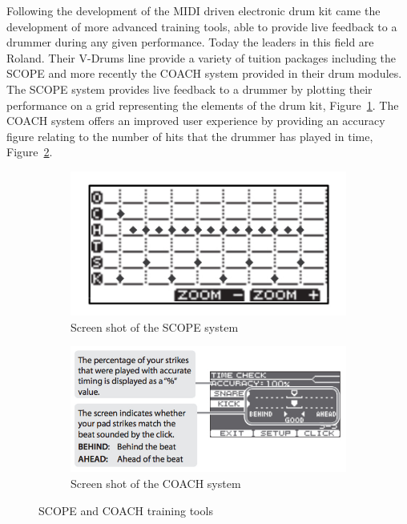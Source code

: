 \documentclass[a4paper, 11pt]{article}
\begin{document}
Following the development of the MIDI driven electronic drum kit came the development of more advanced training tools, able to provide live feedback to a drummer during any given performance. Today the leaders in this field are Roland. Their V-Drums line provide a variety of tuition packages including the SCOPE and more recently the COACH system provided in their drum modules. The SCOPE system provides live feedback to a drummer by plotting their performance on a grid representing the elements of the drum kit, Figure~\ref{fig: scope}. The COACH system offers an improved user experience by providing an accuracy figure relating to the number of hits that the drummer has played in time, Figure~\ref{fig: coach}.
\begin{figure}[h]
\centering
\begin{subfigure}{.5\textwidth}
  \centering
  \includegraphics[width=0.5\linewidth]{images/Scope.jpg}
  \caption{Screen shot of the SCOPE system \cite{roland}}
  \label{fig: scope}
\end{subfigure}%
\begin{subfigure}{.5\textwidth}
  \centering
  \includegraphics[width=0.75\linewidth]{images/coach.jpg}
  \caption{Screen shot of the COACH system \cite{roland}}
  \label{fig: coach}
\end{subfigure}
\caption{SCOPE and COACH training tools}
\label{fig: systems}
\end{figure}

\end{document}
